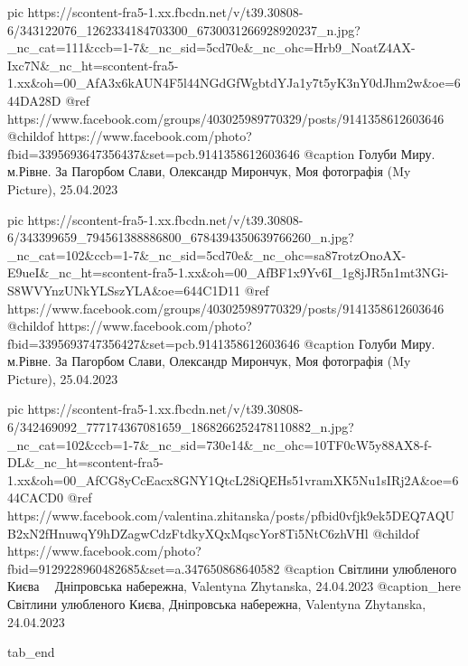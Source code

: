     pic https://scontent-fra5-1.xx.fbcdn.net/v/t39.30808-6/343122076_1262334184703300_6730031266928920237_n.jpg?_nc_cat=111&ccb=1-7&_nc_sid=5cd70e&_nc_ohc=Hrb9_NoatZ4AX-Ixc7N&_nc_ht=scontent-fra5-1.xx&oh=00_AfA3x6kAUN4F5l44NGdGfWgbtdYJa1y7t5yK3nY0dJhm2w&oe=644DA28D
    @ref https://www.facebook.com/groups/403025989770329/posts/9141358612603646
    @childof https://www.facebook.com/photo?fbid=3395693647356437&set=pcb.9141358612603646
    @caption Голуби Миру. м.Рівне. За Пагорбом Слави, Олександр Мирончук, Моя фотографія (My Picture), 25.04.2023

    pic https://scontent-fra5-1.xx.fbcdn.net/v/t39.30808-6/343399659_794561388886800_6784394350639766260_n.jpg?_nc_cat=102&ccb=1-7&_nc_sid=5cd70e&_nc_ohc=sa87rotzOnoAX-E9ueI&_nc_ht=scontent-fra5-1.xx&oh=00_AfBF1x9Yv6I_1g8jJR5n1mt3NGi-S8WVYnzUNkYLSszYLA&oe=644C1D11
    @ref https://www.facebook.com/groups/403025989770329/posts/9141358612603646
    @childof https://www.facebook.com/photo?fbid=3395693747356427&set=pcb.9141358612603646
    @caption Голуби Миру. м.Рівне. За Пагорбом Слави, Олександр Мирончук, Моя фотографія (My Picture), 25.04.2023

    pic https://scontent-fra5-1.xx.fbcdn.net/v/t39.30808-6/342469092_777174367081659_1868266252478110882_n.jpg?_nc_cat=102&ccb=1-7&_nc_sid=730e14&_nc_ohc=10TF0cW5y88AX8-f-DL&_nc_ht=scontent-fra5-1.xx&oh=00_AfCG8yCcEacx8GNY1QtcL28iQEHs51vramXK5Nu1sIRj2A&oe=644CACD0
    @ref https://www.facebook.com/valentina.zhitanska/posts/pfbid0vfjk9ek5DEQ7AQUB2xN2fHnuwqY9hDZagwCdzFtdkyXQxMqscYor8Ti5NtC6zhVHl
    @childof https://www.facebook.com/photo?fbid=9129228960482685&set=a.347650868640582
    @caption Світлини улюбленого Києва 💛💙 Дніпровська набережна, Valentyna Zhytanska, 24.04.2023
    @caption_here Світлини улюбленого Києва, Дніпровська набережна, Valentyna Zhytanska, 24.04.2023


  tab_end
\fi
